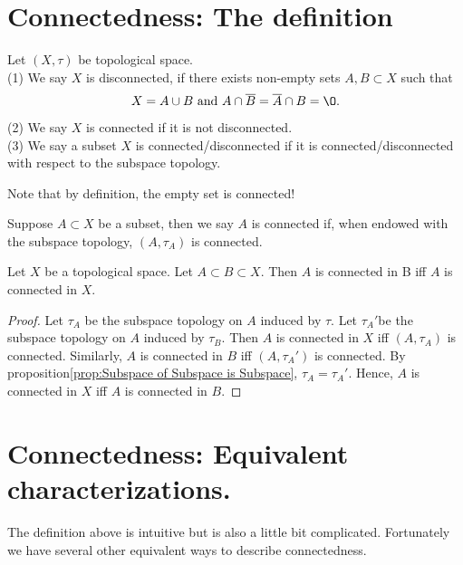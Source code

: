 \section{Connectedness: The definition}
\begin{definition}{}{}
    Let $(X,\tau)$ be  topological space.\\
    (1) We say $X$ is disconnected, if there exists non-empty sets $A,B\subset X$ such that 
    \begin{align*}
        X=A\cup B \text{ and } A\cap \overline{B}=\overline{A}\cap B=\O.
    \end{align*}    
    (2) We say $X$ is connected if it is not disconnected.\\
    (3) We say a subset $X$ is connected/disconnected if it is connected/disconnected with respect to the subspace topology.
\end{definition}
\begin{remark}
    Note that by definition, the empty set is connected!
\end{remark}
\begin{remark}
    Suppose $A\subset X$ be a subset, then we say $A$ is connected if, 
    when endowed with the subspace topology, $(A,\tau_A)$ is connected. 
\end{remark}

\begin{proposition}{}{}
    Let $X$ be a topological space.
    Let $A\subset B\subset X$.
    Then $A$ is connected in B iff $A$ is connected in $X$.
\end{proposition}

\begin{proof}
    Let $\tau_A$ be the subspace topology on $A$ induced by $\tau$.
    Let $\tau_A'$be the subspace topology on $A$ induced by $\tau_B$.
    Then $A$ is connected in $X$ iff $(A,\tau_A)$ is connected.
    Similarly, $A$ is connected in $B$ iff $(A,\tau_A')$ is connected.
    By proposition\ref{prop:Subspace of Subspace is Subspace}, $\tau_A=\tau_A'$.
    Hence, $A$ is connected in $X$ iff $A$ is connected in $B$.
\end{proof}

\section{Connectedness: Equivalent characterizations.}

The definition above is intuitive but is also a little bit complicated. Fortunately
we have several other equivalent ways to describe connectedness.


